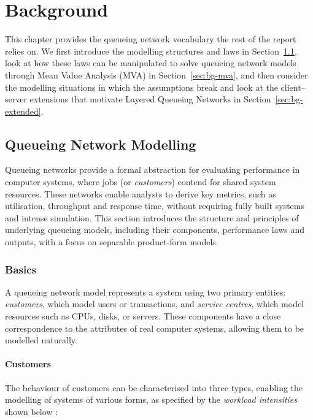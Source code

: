 \chapter{Background}
\label{ch:bg}

This chapter provides the queueing network vocabulary the rest of the report relies on. We first introduce the modelling structures and laws in Section~\ref{sec:bg-modelling}, look at how these laws can be manipulated to solve queueing network models through Mean Value Analysis (MVA) in Section~\ref{sec:bg-mva}, and then consider the modelling situations in which the assumptions break and look at the client--server extensions that motivate Layered Queueing Networks in Section~\ref{sec:bg-extended}.

\section{Queueing Network Modelling}
\label{sec:bg-modelling}

Queueing networks provide a formal abstraction for evaluating performance in computer systems, where jobs (or \textit{customers}) contend for shared system resources. These networks enable analysts to derive key metrics, such as utilisation, throughput and response time, without requiring fully built systems and intense simulation. This section introduces the structure and principles of underlying queueing models, including their components, performance laws and outputs, with a focus on separable product-form models.

\subsection{Basics}
\label{sec:bg-basics}

A queueing network model represents a system using two primary entities: \textit{customers}, which model users or transactions, and \textit{service centres}, which model resources such as CPUs, disks, or servers. These components have a close correspondence to the attributes of real computer systems, allowing them to be modelled naturally.

\subsubsection*{Customers}

The behaviour of customers can be characterised into three types, enabling the modelling of systems of various forms, as specified by the \textit{workload intensities} shown below \cite{lazowska84}:

